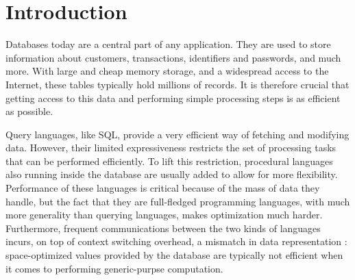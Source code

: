 \documentclass[twoside,11pt,a4paper]{article}
\newcommand{\startsection}[1]{
	\cleardoublepage
	\section{#1}
	\thispagestyle{basic}
}
\begin{document}
\listoffigures



\startsection{Introduction}
\pagestyle{content}

%

Databases today are a central part of any application. They are used to store information about customers, transactions, identifiers and passwords, and much more. With large and cheap memory storage, and a widespread access to the Internet, these tables typically hold millions of records. It is therefore crucial that getting access to this data and performing simple processing steps is as efficient as possible.%

Query languages, like SQL, provide a very efficient way of fetching and modifying data. However, their limited expressiveness restricts the set of processing tasks that can be performed efficiently. To lift this restriction, procedural languages also running inside the database are usually added to allow for more flexibility. Performance of these languages is critical because of the mass of data they handle, but the fact that they are full-fledged programming languages, with much more generality than querying languages, makes optimization much harder. Furthermore, frequent communications between the two kinds of languages incurs, on top of context switching overhead, a mismatch in data representation : space-optimized values provided by the database are typically not efficient when it comes to performing generic-purpse computation.
\end{document}
